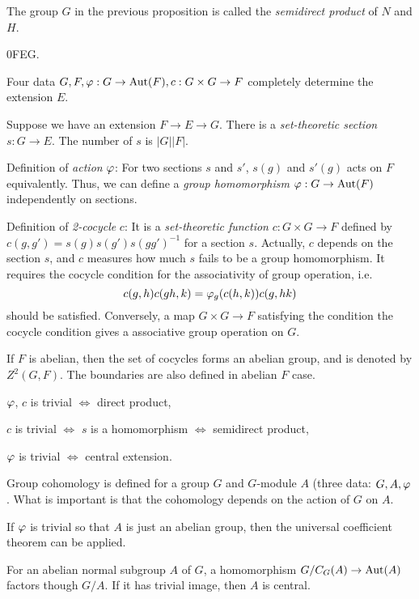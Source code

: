 \documentclass{../note}
\begin{document}
\begin{defn}
The group $G$ in the previous proposition is called the \emph{semidirect product} of $N$ and $H$.
\end{defn}


\begin{es}
0\>F\>E\>G.
\end{es}
Four data $G,F,\varphi:G\to\operatorname{Aut}(F),c:G\times G\to F$ completely determine the extension $E$.

Suppose we have an extension $F\to E\to G$.
There is a \emph{set-theoretic section} $s:G\to E$.
The number of $s$ is $|G||F|$.

Definition of \emph{action} $\varphi$:
For two sections $s$ and $s'$, $s(g)$ and $s'(g)$ acts on $F$ equivalently.
Thus, we can define a \emph{group homomorphism} $\varphi:G\to\operatorname{Aut}(F)$ independently on sections.

Definition of \emph{2-cocycle} $c$:
It is a \emph{set-theoretic function} $c:G\times G\to F$ defined by $c(g,g')=s(g)s(g')s(gg')^{-1}$ for a section $s$.
Actually, $c$ depends on the section $s$, and $c$ measures how much $s$ fails to be a group homomorphism.
It requires the cocycle condition for the associativity of group operation, i.e.
\[c(g,h)c(gh,k)=\varphi_g(c(h,k))c(g,hk)\]
should be satisfied.
Conversely, a map $G\times G\to F$ satisfying the condition the cocycle condition gives a associative group operation on $G$.

If $F$ is abelian, then the set of cocycles forms an abelian group, and is denoted by $Z^2(G,F)$.
The boundaries are also defined in abelian $F$ case.


\begin{parts}
\item $\varphi$, $c$ is trivial $\iff$ direct product,
\item $c$ is trivial $\iff$ $s$ is a homomorphism $\iff$ semidirect product,
\item $\varphi$ is trivial $\iff$ central extension.
\end{parts}

Group cohomology is defined for a group $G$ and $G$-module $A$ (three data: $G,A,\varphi$.
What is important is that the cohomology depends on the action of $G$ on $A$.

If $\varphi$ is trivial so that $A$ is just an abelian group, then the universal coefficient theorem can be applied.




\begin{prb}
For an abelian normal subgroup $A$ of $G$, a homomorphism $G/C_G(A)\to\operatorname{Aut}(A)$ factors though $G/A$.
If it has trivial image, then $A$ is central.
\end{prb}
\end{document}
